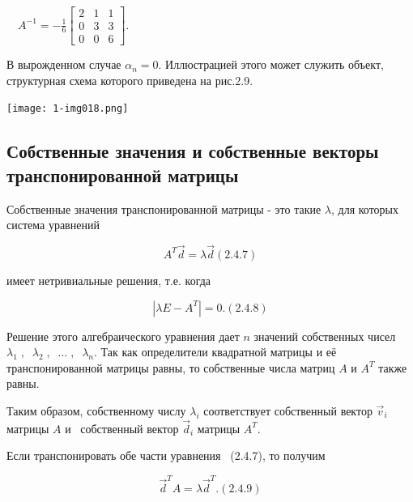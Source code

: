 		\ \  $A^{-1}=-\frac 1 6\left[\begin{matrix}2&1&1\\0&3&3\\0&0&6\end{matrix}\right]$.



		В вырожденном случае  $\alpha _n=0$. Иллюстрацией этого может служить объект, структурная схема которого приведена на рис.2.9.


{\centering  \texttt{[image: 1-img018.png]} \par}

\bigskip

\subsection{Собственные значения и собственные векторы   транспонированной матрицы}
		Собственные значения транспонированной матрицы - это такие  $\lambda $, для которых система уравнений



	\begin{equation}\label{key}
		 A^T\vec d=\lambda \vec d  (2.4.7)
	\end{equation}



		имеет нетривиальные решения, т.е. когда



\begin{equation}\label{key}
		  |\mathit{\lambda E}-A^T|=0.  (2.4.8)
\end{equation}



		Решение этого алгебраического уравнения дает  $n$ значений собственных чисел  $\lambda _1\;,\;\;\lambda _2\;,\;\;...\;,\;\;\lambda _n$. Так
		как определители квадратной матрицы и её транспонированной матрицы равны, то собственные числа матриц  $A$ и  $A^T$
		также равны. 



		Таким образом, собственному числу  $\lambda _i$ соответствует собственный вектор  $\vec v_i$ матрицы  $A$ и \ собственный
		вектор  $\vec d_i$ матрицы  $A^T$.



		Если транспонировать обе части уравнения \ (2.4.7), то получим



		   \begin{equation}\label{key}
		    \vec d^TA=\lambda \vec d^T.  
		    (2.4.9)
		   \end{equation}



